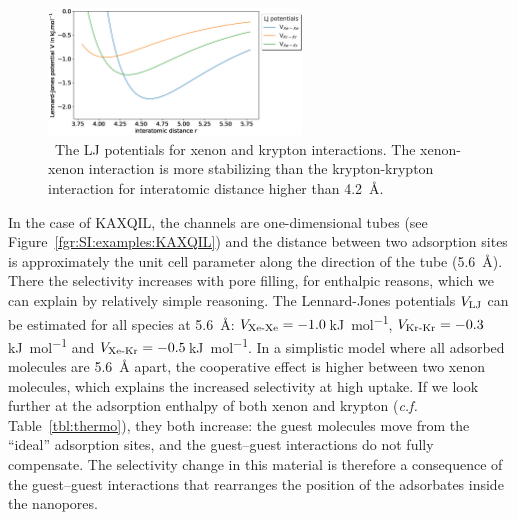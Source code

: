 \documentclass[main.tex]{subfiles}
\begin{document}
\begin{figure}[ht]
  \centering
    \includegraphics[width=0.6\textwidth]{figures/2-thermo/lennard_jones.jpg}
    \caption{\ The LJ potentials for xenon and krypton interactions. The xenon-xenon interaction is more stabilizing than the krypton-krypton interaction for interatomic distance higher than \SI{4.2}{\angstrom}.}
    \label{fgr:LJ}
  \end{figure}

In the case of KAXQIL, the channels are one-dimensional tubes (see Figure~\ref{fgr:SI:examples:KAXQIL}) and the distance between two adsorption sites is approximately the unit cell parameter along the direction of the tube (\SI{5.6}{\angstrom}). There the selectivity increases with pore filling, for enthalpic reasons, which we can explain by relatively simple reasoning. The Lennard-Jones potentials $V_{\text{LJ}}$ can be estimated for all species at \SI{5.6}{\angstrom}: $V_{\text{Xe-Xe}}=-1.0$\,\si{\kilo\joule\per\mol}, $V_{\text{Kr-Kr}}=-0.3$\,\si{\kilo\joule\per\mol} and $V_{\text{Xe-Kr}}=-0.5$\,\si{\kilo\joule\per\mol}. In a simplistic model where all adsorbed molecules are \SI{5.6}{\angstrom} apart, the cooperative effect is higher between two xenon molecules, which explains the increased selectivity at high uptake. If we look further at the adsorption enthalpy of both xenon and krypton (\emph{c.f.} Table~\ref{tbl:thermo}), they both increase: the guest molecules move from the ``ideal'' adsorption sites, and the guest--guest interactions do not fully compensate. The selectivity change in this material is therefore a consequence of the guest--guest interactions that rearranges the position of the adsorbates inside the nanopores.
\end{document}
